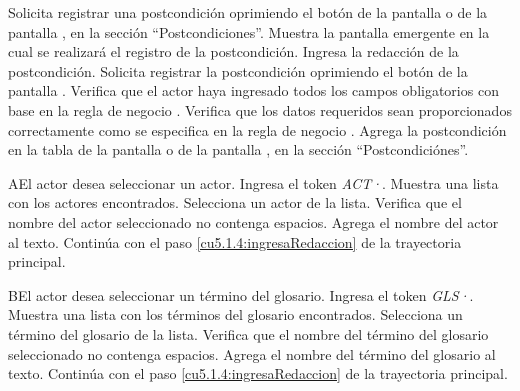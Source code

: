  \begin{UCtrayectoria}
	\UCpaso[\UCactor] Solicita registrar una postcondición oprimiendo el botón \btnRegistrar de la pantalla  o de la pantalla , en la sección ``Postcondiciones''. 
	\UCpaso[\UCsist] Muestra la pantalla emergente  en la cual se realizará el registro de la postcondición. 
	\UCpaso[\UCactor] Ingresa la redacción de la postcondición.           \label{cu5.1.4:ingresaRedaccion}
	\UCpaso[\UCactor] Solicita registrar la postcondición oprimiendo el botón  de la pantalla .  
	\UCpaso[\UCsist] Verifica que el actor haya ingresado todos los campos obligatorios con base en la regla de negocio . 
	\UCpaso[\UCsist] Verifica que los datos requeridos sean proporcionados correctamente como se especifica en la regla de negocio .  
	\UCpaso[\UCsist] Agrega la postcondición en la tabla de la pantalla  o de la pantalla , en la sección ``Postcondiciónes''.
\end{UCtrayectoria}

    

 \begin{UCtrayectoriaA}{A}{El actor desea seleccionar un actor.}
 	\UCpaso[\UCactor] Ingresa el token {\it ACT·}.
 	\UCpaso[\UCsist] Muestra una lista con los actores encontrados.
 	\UCpaso[\UCactor] Selecciona un actor de la lista.
  	\UCpaso[\UCsist] Verifica que el nombre del actor seleccionado no contenga espacios. 
  	\UCpaso[\UCsist] Agrega el nombre del actor al texto.
    \UCpaso[] Continúa con el paso \ref{cu5.1.4:ingresaRedaccion} de la trayectoria principal.
 \end{UCtrayectoriaA}
 \begin{UCtrayectoriaA}{B}{El actor desea seleccionar un término del glosario.}
 	\UCpaso[\UCactor] Ingresa el token {\it GLS·}.	
 	\UCpaso[\UCsist] Muestra una lista con los términos del glosario encontrados.
 	\UCpaso[\UCactor] Selecciona un término del glosario de la lista.
  	\UCpaso[\UCsist] Verifica que el nombre del término del glosario seleccionado no contenga espacios. 
  	\UCpaso[\UCsist] Agrega el nombre del término del glosario al texto.
    \UCpaso[] Continúa con el paso \ref{cu5.1.4:ingresaRedaccion} de la trayectoria principal.
 \end{UCtrayectoriaA}

